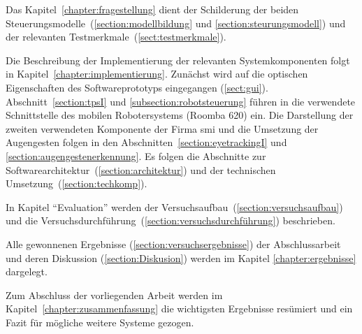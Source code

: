 Das Kapitel~\ref{chapter:fragestellung} dient der Schilderung der beiden Steuerungsmodelle~(\ref{section:modellbildung} und \ref{section:steurungsmodell}) und der relevanten Testmerkmale~(\ref{sect:testmerkmale}).

Die Beschreibung der Implementierung der relevanten Systemkomponenten folgt in Kapitel~\ref{chapter:implementierung}. Zunächst wird auf die optischen Eigenschaften des Softwareprototyps eingegangen (\ref{sect:gui}). Abschnitt~\ref{section:tpsI} und \ref{subsection:robotsteuerung} führen in die verwendete Schnittstelle des mobilen Robotersystems (Roomba 620) ein. Die Darstellung der zweiten verwendeten Komponente \et \iV der Firma \acf{smi} und die Umsetzung der Augengesten folgen in den Abschnitten~\ref{section:eyetrackingI} und \ref{section:augengestenerkennung}. Es folgen die Abschnitte zur Softwarearchitektur~(\ref{section:architektur}) und der technischen Umsetzung~(\ref{section:techkomp}).

In Kapitel \enquote{Evaluation} werden der Versuchsaufbau~(\ref{section:versuchsaufbau}) und die Versuchsdurchführung~(\ref{section:versuchsdurchführung}) beschrieben.

Alle gewonnenen Ergebnisse (\ref{section:versuchsergebnisse}) der Abschlussarbeit und deren Diskussion (\ref{section:Diskusion}) werden im Kapitel \ref{chapter:ergebnisse} dargelegt.

Zum Abschluss der vorliegenden Arbeit werden im Kapitel~\ref{chapter:zusammenfassung} die wichtigsten Ergebnisse resümiert und ein Fazit für mögliche weitere Systeme gezogen.
